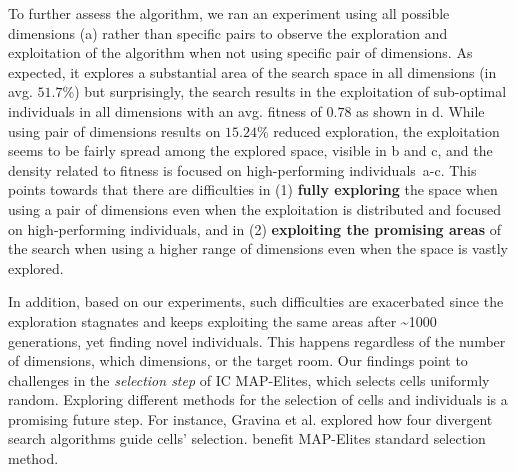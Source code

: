 To further assess the algorithm, we ran an experiment using all possible dimensions (a) rather than specific pairs to observe the exploration and exploitation of the algorithm when not using specific pair of dimensions. As expected, it explores a substantial area of the search space in all dimensions (in avg. $51.7$\%) but surprisingly, the search results in the exploitation of sub-optimal individuals in all dimensions with an avg. fitness of $0.78$ as shown in d. While using pair of dimensions results on $15.24$\% reduced exploration, the exploitation seems to be fairly spread among the explored space, visible in b and c, and the density related to fitness is focused on high-performing individuals~a-c. This points towards that there are difficulties in (1) \textbf{fully exploring} the space when using a pair of dimensions even when the exploitation is distributed and focused on high-performing individuals, and in (2) \textbf{exploiting the promising areas} of the search when using a higher range of dimensions even when the space is vastly explored. 

In addition, based on our experiments, such difficulties are exacerbated since the exploration stagnates and keeps exploiting the same areas after \~{}1000 generations, yet finding novel individuals. This happens regardless of the number of dimensions, which dimensions, or the target room. Our findings point to challenges in the \emph{selection step} of IC MAP-Elites, which selects cells uniformly random. Exploring different methods for the selection of cells and individuals is a promising future step. For instance, Gravina et al. \cite{p6Gravina2019-blendingNotionsDiversity} explored how four divergent search algorithms guide cells' selection.
benefit MAP-Elites standard selection method.


